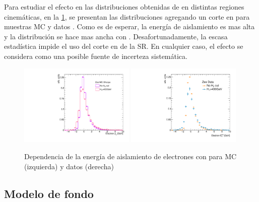 

Para estudiar el efecto en las distribuciones obtenidas de {\Zee} en distintas
regiones cinemáticas, en la \cref{fig:electron_iso_HT}, se presentan las
distribuciones agregando un corte en {\HT} para muestras MC y datos {\Zee}. Como
es de esperar, la energía de aislamiento es mas alta y la distribución se hace
mas ancha con \HT.
Desafortunadamente, la escasa estadística impide el uso del corte en {\HT} de la
SR. En cualquier caso, el efecto se considera como una posible fuente de
incerteza sistemática.

\begin{figure}[!htbp]
  \centering

  \includegraphics[width=0.49\textwidth]{figures/electron_iso_ZeeHMC_corr}
  \includegraphics[width=0.49\textwidth]{figures/electron_iso_ZeeH_corr}

  \caption{Dependencia de la energía de aislamiento de electrones con {\HT}
    para MC (izquierda) y datos (derecha) \Zee}
    \label{fig:electron_iso_HT}

\end{figure}



\subsection{Modelo de fondo} \label{sec:jfake_bkg_template}

